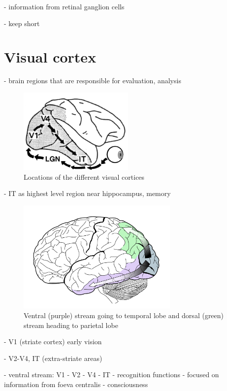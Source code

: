 		- information from retinal ganglion cells
	
		- keep short
	
	\section{Visual cortex}

		- brain regions that are responsible for evaluation, analysis

		\begin{figure}[H]
			\centering
			\includegraphics[width=0.5\textwidth]{images/riesenhuber-poggio-2000-visualpathway.png}
			\caption{Locations of the different visual cortices}
		\end{figure}
		
		- IT as highest level region near hippocampus, memory

		\begin{figure}[H]
			\centering
			\captionsetup{justification=centering,margin=2cm}
			\includegraphics[width=0.7\textwidth]{images/visual-stream2.pdf}
			\caption{Ventral (purple) stream going to temporal lobe and dorsal (green) stream heading to parietal lobe}
		\end{figure}
		
		- V1 (striate cortex) early vision
		
		- V2-V4, IT (extra-striate areas)
		
		- ventral stream: V1 - V2 - V4 - IT
			- recognition functions
			- focused on information from foeva centralis
			- consciousness
		
